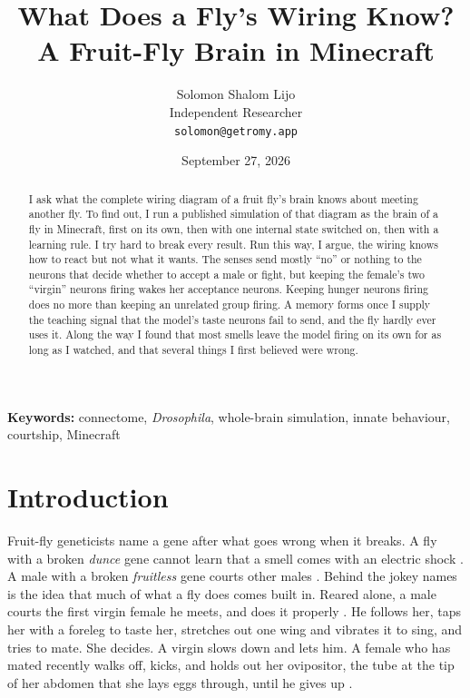 \documentclass[11pt,a4paper]{article}
\title{%
  \textbf{What Does a Fly's Wiring Know?\\
  A Fruit-Fly Brain in Minecraft}%
}
\author{
  Solomon Shalom Lijo \\
  Independent Researcher \\
  \texttt{solomon@getromy.app}
}
\date{September 27, 2026}
\begin{document}
\maketitle

\begin{abstract}
\noindent I ask what the complete wiring diagram of a fruit fly's brain knows about meeting another fly. To find out, I run a published simulation of that diagram as the brain of a fly in Minecraft, first on its own, then with one internal state switched on, then with a learning rule. I try hard to break every result. Run this way, I argue, the wiring knows how to react but not what it wants. The senses send mostly ``no'' or nothing to the neurons that decide whether to accept a male or fight, but keeping the female's two ``virgin'' neurons firing wakes her acceptance neurons. Keeping hunger neurons firing does no more than keeping an unrelated group firing. A memory forms once I supply the teaching signal that the model's taste neurons fail to send, and the fly hardly ever uses it. Along the way I found that most smells leave the model firing on its own for as long as I watched, and that several things I first believed were wrong.
\end{abstract}

\medskip
\noindent\textbf{Keywords:} connectome, \emph{Drosophila}, whole-brain simulation, innate behaviour, courtship, Minecraft

\section{Introduction}
\label{sec:introduction}

Fruit-fly geneticists name a gene after what goes wrong when it breaks. A fly with a broken \emph{dunce} gene cannot learn that a smell comes with an electric shock \citep{dudai1976dunce}. A male with a broken \emph{fruitless} gene courts other males \citep{ryner1996control}. Behind the jokey names is the idea that much of what a fly does comes built in. Reared alone, a male courts the first virgin female he meets, and does it properly \citep{siegel1979conditioned}. He follows her, taps her with a foreleg to taste her, stretches out one wing and vibrates it to sing, and tries to mate. She decides. A virgin slows down and lets him. A female who has mated recently walks off, kicks, and holds out her ovipositor, the tube at the tip of her abdomen that she lays eggs through, until he gives up \citep{greenspan2000courtship}.
\end{document}
